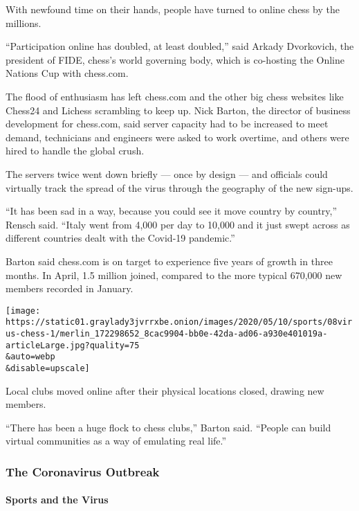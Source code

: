 With newfound time on their hands, people have turned to online chess by
the millions.

``Participation online has doubled, at least doubled,'' said Arkady
Dvorkovich, the president of FIDE, chess's world governing body, which
is co-hosting the Online Nations Cup with chess.com.

The flood of enthusiasm has left chess.com and the other big chess
websites like Chess24 and Lichess scrambling to keep up. Nick Barton,
the director of business development for chess.com, said server capacity
had to be increased to meet demand, technicians and engineers were asked
to work overtime, and others were hired to handle the global crush.

The servers twice went down briefly --- once by design --- and officials
could virtually track the spread of the virus through the geography of
the new sign-ups.

``It has been sad in a way, because you could see it move country by
country,'' Rensch said. ``Italy went from 4,000 per day to 10,000 and it
just swept across as different countries dealt with the Covid-19
pandemic.''

Barton said chess.com is on target to experience five years of growth in
three months. In April, 1.5 million joined, compared to the more typical
670,000 new members recorded in January.

\texttt{[image: https://static01.graylady3jvrrxbe.onion/images/2020/05/10/sports/08virus-chess-1/merlin\_172298652\_8cac9904-bb0e-42da-ad06-a930e401019a-articleLarge.jpg?quality=75\\\&auto=webp\\\&disable=upscale]}

Local clubs moved online after their physical locations closed, drawing
new members.

``There has been a huge flock to chess clubs,'' Barton said. ``People
can build virtual communities as a way of emulating real life.''

\hypertarget{the-coronavirus-outbreak}{%
\subsubsection{The Coronavirus
Outbreak}\label{the-coronavirus-outbreak}}

\hypertarget{sports-and-the-virus}{%
\paragraph{Sports and the Virus}\label{sports-and-the-virus}}

